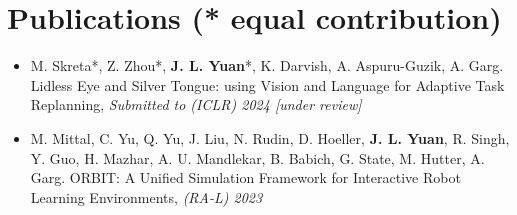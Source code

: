 \documentclass[letterpaper,11pt]{article}
\begin{document}
\section{Publications \small{(* equal contribution)}}
  \begin{itemize}[leftmargin=0.15in, label={}]
    \item{
    \small{M. Skreta*, Z. Zhou*,  \textbf{J. L. Yuan}*, K. Darvish, A. Aspuru-Guzik, A. Garg. Lidless Eye and Silver Tongue: using Vision and Language for Adaptive Task Replanning, \textit{Submitted to (ICLR) 2024 [under review]}}
    }
  \end{itemize}\vspace{-20pt}
\begin{itemize}[leftmargin=0.15in, label={}]
    \item{
    \small{M. Mittal, C. Yu, Q. Yu, J. Liu, N. Rudin, D. Hoeller, \textbf{J. L. Yuan}, R. Singh, Y. Guo, H. Mazhar, A. U. Mandlekar, B. Babich, G. State, M. Hutter, A. Garg. ORBIT: A Unified Simulation Framework for Interactive Robot Learning Environments, \textit{(RA-L) 2023}}
    }
 \end{itemize}
\vspace{-20pt}
 
\end{document}

